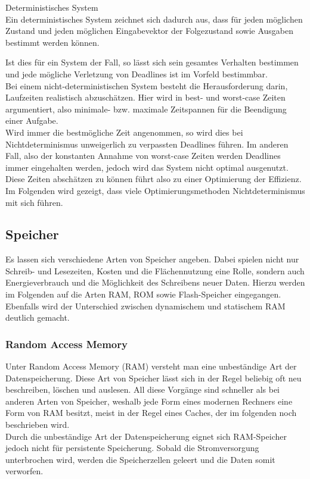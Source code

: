 \begin{definition}{Deterministisches System}\\
Ein deterministisches System zeichnet sich dadurch aus, dass für jeden möglichen Zustand und jeden möglichen Eingabevektor der Folgezustand sowie Ausgaben bestimmt werden können.
\end{definition}
Ist dies für ein System der Fall, so lässt sich sein gesamtes Verhalten bestimmen und jede mögliche Verletzung von Deadlines ist im Vorfeld bestimmbar.\\
Bei einem nicht-deterministischen System besteht die Herausforderung darin, Laufzeiten realistisch abzuschätzen. Hier wird in best- und worst-case Zeiten argumentiert, also minimale- bzw. maximale Zeitspannen für die Beendigung einer Aufgabe.\\
Wird immer die bestmögliche Zeit angenommen, so wird dies bei Nichtdeterminismus unweigerlich zu verpassten Deadlines führen. Im anderen Fall, also der konstanten Annahme von worst-case Zeiten werden Deadlines immer eingehalten werden, jedoch wird das System nicht optimal ausgenutzt. Diese Zeiten abschätzen zu können führt also zu einer Optimierung der Effizienz.\\
Im Folgenden wird gezeigt, dass viele Optimierungsmethoden Nichtdeterminismus mit sich führen.
\subsection{Speicher}\label{2.2}
Es lassen sich verschiedene Arten von Speicher angeben. Dabei spielen nicht nur Schreib- und Lesezeiten, Kosten und die Flächennutzung eine Rolle, sondern auch Energieverbrauch und die Möglichkeit des Schreibens neuer Daten. Hierzu werden im Folgenden auf die Arten RAM, ROM sowie Flash-Speicher eingegangen. Ebenfalls wird der Unterschied zwischen dynamischem und statischem RAM deutlich gemacht.

\subsubsection{Random Access Memory}
Unter Random Access Memory (RAM) versteht man eine unbeständige Art der Datenspeicherung. Diese Art von Speicher lässt sich in der Regel beliebig oft neu beschreiben, löschen und auslesen. All diese Vorgänge sind schneller als bei anderen Arten von Speicher, weshalb jede Form eines modernen Rechners eine Form von RAM besitzt, meist in der Regel eines Caches, der im folgenden noch beschrieben wird.\\
Durch die unbeständige Art der Datenspeicherung eignet sich RAM-Speicher jedoch nicht für persistente Speicherung. Sobald die Stromversorgung unterbrochen wird, werden die Speicherzellen geleert und die Daten somit verworfen.

